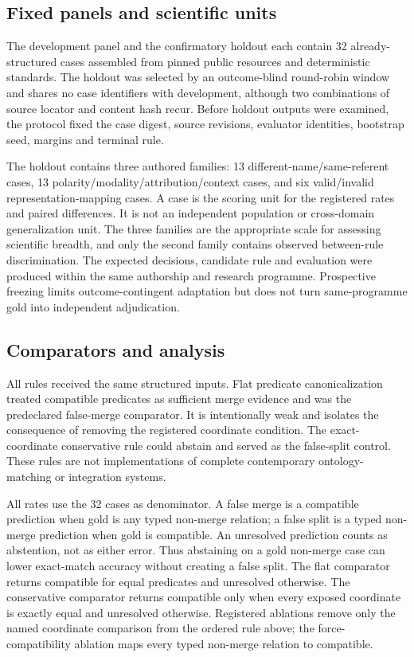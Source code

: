\subsection{Fixed panels and scientific units}

The development panel and the confirmatory holdout each contain 32
already-structured cases assembled from pinned public resources and
deterministic standards. The holdout was selected by an outcome-blind
round-robin window and shares no case identifiers with development, although
two combinations of source locator and content hash recur. Before holdout outputs were
examined, the protocol fixed the case digest, source revisions, evaluator
identities, bootstrap seed, margins and terminal rule.

The holdout contains three authored families: 13 different-name/same-referent
cases, 13 polarity/modality/attribution/context cases, and six valid/invalid
representation-mapping cases. A case is the scoring unit for the registered
rates and paired differences. It is not an independent population or
cross-domain generalization unit. The three families are the appropriate scale
for assessing scientific breadth, and only the second family contains observed
between-rule discrimination. The expected decisions, candidate rule and
evaluation were produced within the same authorship and research programme.
Prospective freezing limits outcome-contingent adaptation but does not turn
same-programme gold into independent adjudication.

\subsection{Comparators and analysis}

All rules received the same structured inputs. Flat predicate canonicalization
treated compatible predicates as sufficient merge evidence and was the
predeclared false-merge comparator. It is intentionally weak and isolates the
consequence of removing the registered coordinate condition. The
exact-coordinate conservative rule could abstain and served as the false-split
control. These rules are not implementations of complete contemporary
ontology-matching or integration systems.

All rates use the 32 cases as denominator. A false merge is a compatible
prediction when gold is any typed non-merge relation; a false split is a typed
non-merge prediction when gold is compatible. An unresolved prediction counts
as abstention, not as either error. Thus abstaining on a gold non-merge case can
lower exact-match accuracy without creating a false split. The flat comparator
returns compatible for equal predicates and unresolved otherwise. The
conservative comparator returns compatible only when every exposed coordinate
is exactly equal and unresolved otherwise. Registered ablations remove only
the named coordinate comparison from the ordered rule above; the
force-compatibility ablation maps every typed non-merge relation to compatible.

